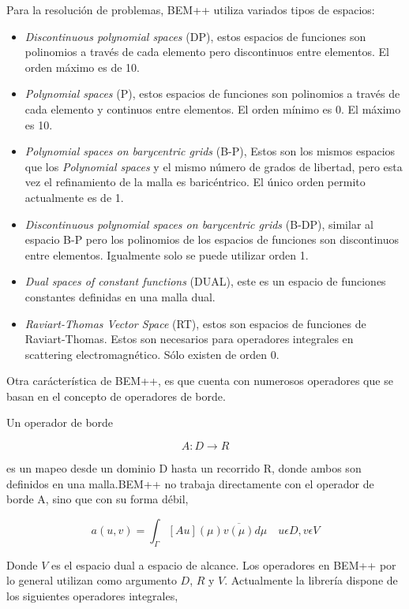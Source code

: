 \documentclass[12pt,letterpaper]{article}
\numberwithin{equation}{section}
\begin{document}
Para la resolución de problemas, BEM++ utiliza variados tipos de espacios:

\begin{itemize}
	\item \textit{Discontinuous polynomial spaces} (DP), estos espacios de funciones son polinomios a través de cada elemento pero discontinuos entre elementos. El orden máximo es de 10.
	\item \textit{Polynomial spaces} (P), estos espacios de funciones son polinomios a través de cada elemento y continuos entre elementos. El orden mínimo es 0. El máximo es 10.
	\item \textit{Polynomial spaces on barycentric grids} (B-P), Estos son los mismos espacios que los \textit{Polynomial spaces} y el mismo número de grados de libertad, pero esta vez el refinamiento de la malla es baricéntrico. El único orden permito actualmente es de 1.
	\item \textit{Discontinuous polynomial spaces on barycentric grids} (B-DP), similar al espacio B-P pero los polinomios de los espacios de funciones son discontinuos entre elementos. Igualmente solo se puede utilizar orden 1.
	\item \textit{Dual spaces of constant functions} (DUAL), este es un espacio de funciones constantes definidas en una malla dual.
	\item \textit{Raviart-Thomas Vector Space} (RT), estos son espacios de funciones de Raviart-Thomas. Estos son necesarios para operadores integrales en scattering electromagnético. Sólo existen de orden 0.
\end{itemize}


Otra carácterística de BEM++, es que cuenta con numerosos operadores que se basan en el concepto de operadores de borde.

Un operador de borde

$$A\colon D\rightarrow R$$

es un mapeo desde un dominio D hasta un recorrido R, donde ambos son definidos en una malla.BEM++ no trabaja directamente con el operador de borde A, sino que con su forma débil,

$$a(u,v)=\int_{\Gamma}\left[ Au\right](\mu) \overline{v(\mu)} d\mu \quad u\epsilon D,v\epsilon V $$

\noindent Donde $V$ es el espacio dual a espacio de alcance. Los operadores en BEM++ por lo general utilizan como argumento $D$, $R$ y $V$. Actualmente la librería dispone de los siguientes operadores integrales,
\end{document}
